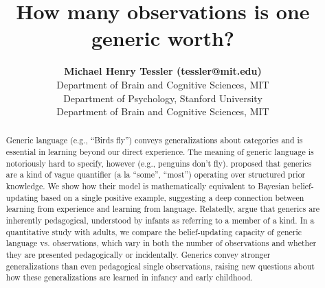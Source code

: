 \documentclass[10pt,letterpaper]{article}
\title{How many observations is one generic worth?}
\author{{\large \bf Michael Henry Tessler (tessler@mit.edu)} \\
  Department of Brain and Cognitive Sciences, MIT
  \AND {\large \bf Sophie Bridgers (sbridge@stanford.edu)} \\
  Department of Psychology,  Stanford University
    \AND {\large \bf  Joshua B. Tenenbaum (jbt@mit.edu)} \\
  Department of Brain and Cognitive Sciences, MIT
  }
\begin{document}
\maketitle


\begin{abstract}

Generic language (e.g., ``Birds fly'') conveys generalizations about categories and is essential in learning beyond our direct experience. The meaning of generic language is notoriously hard to specify, however (e.g., penguins don't fly).  proposed that generics are a kind of vague quantifier (a la ``some'', ``most'') operating over structured prior knowledge. We show how their model is mathematically equivalent to Bayesian belief-updating based on a single positive example, suggesting a deep connection between learning from experience and learning from language. Relatedly,  argue that generics are inherently pedagogical, understood by infants as referring to a member of a kind. In a quantitative study with adults, we compare the belief-updating capacity of generic language vs. observations, which vary in both the number of observations and whether they are presented pedagogically or incidentally. Generics convey stronger generalizations than even pedagogical single observations, raising new questions about how these generalizations are learned in infancy and early childhood.



\end{abstract}
\end{document}
